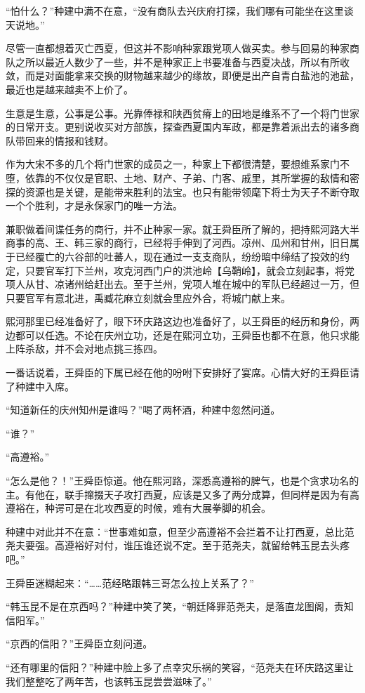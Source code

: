 “怕什么？”种建中满不在意，“没有商队去兴庆府打探，我们哪有可能坐在这里谈天说地。”

尽管一直都想着灭亡西夏，但这并不影响种家跟党项人做买卖。参与回易的种家商队之所以最近人数少了一些，并不是种家正上书要准备与西夏决战，所以有所收敛，而是对面能拿来交换的财物越来越少的缘故，即便是出产自青白盐池的池盐，最近也是越来越卖不上价了。

生意是生意，公事是公事。光靠俸禄和陕西贫瘠上的田地是维系不了一个将门世家的日常开支。更别说收买对方部族，探查西夏国内军政，都是靠着派出去的诸多商队带回来的情报和钱财。

作为大宋不多的几个将门世家的成员之一，种家上下都很清楚，要想维系家门不堕，依靠的不仅仅是官职、土地、财产、子弟、门客、戚里，其所掌握的敌情和密探的资源也是关键，是能带来胜利的法宝。也只有能带领麾下将士为天子不断夺取一个个胜利，才是永保家门的唯一方法。

兼职做着间谍任务的商行，并不止种家一家。就王舜臣所了解的，把持熙河路大半商事的高、王、韩三家的商行，已经将手伸到了河西。凉州、瓜州和甘州，旧日属于已经覆亡的六谷部的吐蕃人，现在通过一支支商队，纷纷暗中缔结了投效的约定，只要官军打下兰州，攻克河西门户的洪池岭【乌鞘岭】，就会立刻起事，将党项人从甘、凉诸州给赶出去。至于兰州，党项人堆在城中的军队已经超过一万，但只要官军有意北进，禹臧花麻立刻就会里应外合，将城门献上来。

熙河那里已经准备好了，眼下环庆路这边也准备好了，以王舜臣的经历和身份，两边都可以任选。不论在庆州立功，还是在熙河立功，王舜臣也都不在意，他只求能上阵杀敌，并不会对地点挑三拣四。

一番话说着，王舜臣的下属已经在他的吩咐下安排好了宴席。心情大好的王舜臣请了种建中入席。

“知道新任的庆州知州是谁吗？”喝了两杯酒，种建中忽然问道。

“谁？”

“高遵裕。”

“怎么是他？！”王舜臣惊道。他在熙河路，深悉高遵裕的脾气，也是个贪求功名的主。有他在，联手撺掇天子攻打西夏，应该是又多了两分成算，但同样是因为有高遵裕在，种谔可是在北攻西夏的时候，难有大展拳脚的机会。

种建中对此并不在意：“世事难如意，但至少高遵裕不会拦着不让打西夏，总比范尧夫要强。高遵裕好对付，谁压谁还说不定。至于范尧夫，就留给韩玉昆去头疼吧。”

王舜臣迷糊起来：“……范经略跟韩三哥怎么拉上关系了？”

“韩玉昆不是在京西吗？”种建中笑了笑，“朝廷降罪范尧夫，是落直龙图阁，责知信阳军。”

“京西的信阳？”王舜臣立刻问道。

“还有哪里的信阳？”种建中脸上多了点幸灾乐祸的笑容，“范尧夫在环庆路这里让我们整整吃了两年苦，也该韩玉昆尝尝滋味了。”

